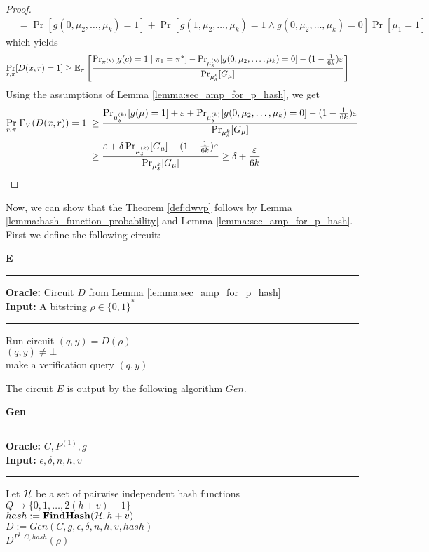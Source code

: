 \begin{proof}
\begin{align*}
&= \Pr[g(0,\mu_2, \dots,\mu_k) = 1] + \Pr[g(1,\mu_2,\dots,\mu_k) = 1 \land g(0, \mu_2, \dots, \mu_k) = 0] \Pr[\mu_1 = 1]
\end{align*}
which yields
\begin{align*}
  \underset{r,\pi}{\Pr}[D(x,r) = 1]
&\geq \mathbb{E}_{\pi}\left[\frac{{\Pr}_{\pi^{(k)}}[g(c) = 1 \mid \pi_1 = \pi^*] -
{\Pr}_{\mu_{\delta}^{(k)}}[g(0, \mu_2, \dots, \mu_k) = 0] - (1 - \frac{1}{6k})\epsilon} {{\Pr}_{\mu_{\delta}^{k}}[G_{\mu}]}\right] \notag
 \end{align*}
 Using the assumptions of Lemma \ref{lemma:sec_amp_for_p_hash}, we get
 \begin{align}
   \label{eq:proof_final}
   \underset{r,\pi}{\Pr}[\Gamma_V(D(x,r)) = 1]
 &\geq \frac{ {\Pr}_{\mu_{\delta}^{(k)}}[g(\mu) = 1] + \epsilon +
 \Pr_{\mu_{\delta}^{(k)}}[g(0, \mu_2, \dots, \mu_k) = 0] - (1 - \frac{1}{6k})\epsilon}
 {\Pr_{\mu_{\delta}^{k}}[G_{\mu}]} \notag\\
 &\geq \frac{\epsilon +
\delta\Pr_{\mu_{\delta}^{(k)}}[G_{\mu}] - (1 - \frac{1}{6k})\epsilon}
{\Pr_{\mu_{\delta}^{k}}[G_{\mu}]} \geq \delta + \frac{\epsilon}{6k}
\end{align}
\end{proof}
Now, we can show that the Theorem \ref{def:dwvp} follows by Lemma \ref{lemma:hash_function_probability} and Lemma \ref{lemma:sec_amp_for_p_hash}.
First we define the following circuit:
\begin{codeblock}
  \textbf{E}
  \medskip
  \hrule
  \medskip
  \textbf{Oracle:} Circuit $D$ from Lemma \ref{lemma:sec_amp_for_p_hash}  \\
  \textbf{Input:} A bitstring $\rho \in \{0,1\}^{*}$
  \medskip\hrule\medskip
  Run circuit $(q,y) = D(\rho)$ \\
  \If $(q,y) \neq \bot$ \then \\
  \IndI make a verification query $(q,y)$
\end{codeblock}
%
The circuit $E$ is output by the following algorithm $Gen$.
\begin{codeblock}
  \textbf{Gen}
  \medskip
  \hrule
  \medskip
  \textbf{Oracle:}  $C, P^{(1)}, g$\\
  \textbf{Input:} $\epsilon, \delta, n, h, v$
  \medskip\hrule\medskip
  Let $\cH$ be a set of pairwise independent hash functions $Q \rightarrow \{0, 1, \dots, 2(h+v)-1\}$ \\
  $hash := \textbf{FindHash}(\cH,h+v)$ \\
  $D := Gen(C, g, \epsilon, \delta, n, h, v, hash)$ \\
  \return $D^{P^{1}, C, hash}(\rho)$
\end{codeblock}

